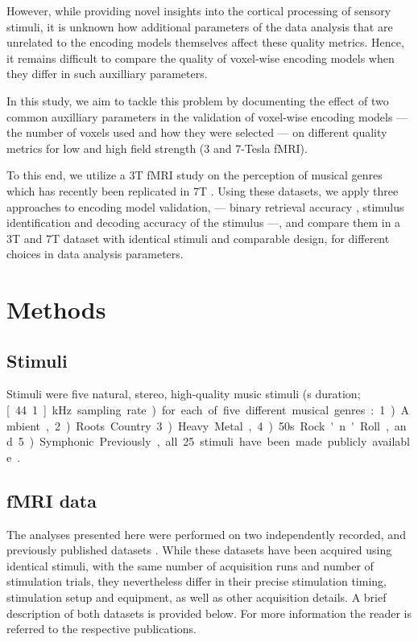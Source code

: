 However, while providing novel insights into the cortical processing of sensory
stimuli, it is unknown how additional parameters of the data analysis that are unrelated to the encoding models themselves
affect these quality metrics.
Hence, it remains difficult to compare the quality of voxel-wise encoding models when they differ in such auxilliary parameters.

In this study, we aim to tackle this problem by documenting the effect of two common auxilliary parameters in the
validation of voxel-wise encoding models --- the number of voxels used and how they were selected --- on different
quality metrics for low and high field strength (3 and 7-Tesla f{MRI}).

To this end, we utilize a 3T f{MRI} study on the perception of musical genres
\citep{CTK+2012} which has recently been replicated in 7T \citep{HDH+2015}.
Using these datasets, we apply three approaches to encoding model
validation, --- binary retrieval accuracy \citep{ML08}, stimulus identification \citep{KG+08,SF14} and
decoding accuracy of the stimulus ---, and compare them in a 3T and 7T dataset with identical stimuli
and comparable design, for different choices in data analysis parameters.

\section*{Methods}

\subsection*{Stimuli}

Stimuli were five natural, stereo, high-quality music stimuli (\unit[6]{s}
duration; \unit[44.1]{kHz} sampling rate) for each of five different musical
genres: 1) Ambient, 2) Roots Country 3) Heavy Metal, 4) 50s Rock'n'Roll, and 5)
Symphonic. Previously, all 25 stimuli have been made publicly available
\citep{HDH+2015}.

\subsection*{f{MRI} data}

The analyses presented here were performed on two independently recorded, and
previously published datasets \citep{CTK+2012,HDH+2015} . While these datasets
have been acquired using identical stimuli, with the same number of acquisition
runs and number of stimulation trials, they nevertheless differ in their
precise stimulation timing, stimulation setup and equipment, as well as other
acquisition details. A brief description of both datasets is provided below.
For more information the reader is referred to the respective publications.

